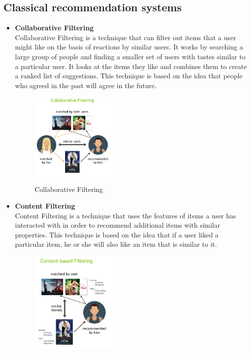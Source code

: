 \subsection{Classical recommendation systems}\label{subsec:classical-recommendation-systems}
\begin{itemize}
    \item \textbf{Collaborative Filtering} \\ Collaborative Filtering is a technique that can filter out items that a user might like on the basis of reactions by similar users. It works by searching a large group of people and finding a smaller set of users with tastes similar to a particular user. It looks at the items they like and combines them to create a ranked list of suggestions. This technique is based on the idea that people who agreed in the past will agree in the future.
    \begin{figure}[H]
        \centering
        \includegraphics[width=0.4\textwidth]{assets/collaborative_filtering.png}
        \caption{Collaborative Filtering}
        \label{fig:collaborative-filtering}
        \cite{NvidiaRecSys}
    \end{figure}
    \item \textbf{Content Filtering}\\Content Filtering is a technique that uses the features of items a user has interacted with in order to recommend additional items with similar properties. This technique is based on the idea that if a user liked a particular item, he or she will also like an item that is similar to it. 
    \begin{figure}[H]
        \centering
        \includegraphics[width=0.4\textwidth]{assets/content_based_filtering.png}

\end{figure}
\end{itemize}
